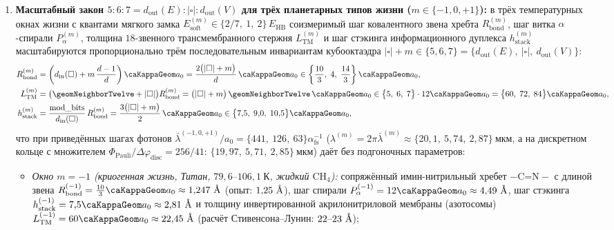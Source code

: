 \begin{theorem}
\begin{enumerate}[leftmargin=*]
\item \textbf{Масштабный закон $5:6:7 = d_{\mathrm{out}}(E) : |\square| : d_{\mathrm{out}}(V)$ для трёх планетарных типов жизни ($m\in\{-1,0,+1\}$):}
  в трёх температурных окнах жизни с квантами мягкого замка $E_{\mathrm{soft}}^{(m)} \in \{2/7,\ 1,\ 2\}\,E_{\mathrm{HB}}$ соизмеримый шаг ковалентного звена хребта $R_{\mathrm{bond}}^{(m)}$, шаг витка $\alpha$-спирали $P_\alpha^{(m)}$, толщина $18$-звенного трансмембранного стержня $L_{\mathrm{TM}}^{(m)}$ и шаг стэкинга информационного дуплекса $h_{\mathrm{stack}}^{(m)}$ масштабируются пропорционально трём последовательным инвариантам кубооктаэдра $|\square| + m \in \{5, 6, 7\} = \{d_{\mathrm{out}}(E),\ |\square|,\ d_{\mathrm{out}}(V)\}$:
  \begin{equation}
  \label{eq:bio-three-life-5-6-7-law}
  \begin{aligned}
    R_{\mathrm{bond}}^{(m)} &= \left(d_{\mathrm{in}}(\square) + m\,\frac{d-1}{d}\right)\caKappaGeom a_0
    = \frac{2\bigl(|\square| + m\bigr)}{d}\,\caKappaGeom a_0
    \in \left\{\frac{10}{3},\; 4,\; \frac{14}{3}\right\}\caKappaGeom a_0,\\
    L_{\mathrm{TM}}^{(m)} &= \bigl(\geomNeighborTwelve + |\square|\bigr) R_{\mathrm{bond}}^{(m)}
    = \bigl(|\square| + m\bigr)\,\geomNeighborTwelve\,\caKappaGeom a_0
    \in \bigl\{5,\; 6,\; 7\bigr\}\cdot 12\caKappaGeom a_0 = \bigl\{60,\; 72,\; 84\bigr\}\caKappaGeom a_0,\\
    h_{\mathrm{stack}}^{(m)} &= \frac{\mathrm{mod\_bits}}{d_{\mathrm{in}}(\square)}\,R_{\mathrm{bond}}^{(m)}
    = \frac{3\bigl(|\square| + m\bigr)}{2}\,\caKappaGeom a_0
    \in \bigl\{7{,}5,\; 9{,}0,\; 10{,}5\bigr\}\caKappaGeom a_0,
  \end{aligned}
  \end{equation}
  что при приведённых шагах фотонов $\bar\lambda^{(-1,0,+1)}/a_0 = \{441,\ 126,\ 63\}\alpha_{\mathrm{fs}}^{-1}$ ($\lambda^{(m)} = 2\pi\bar\lambda^{(m)} \approx \{20{,}1,\ 5{,}74,\ 2{,}87\}\ \text{мкм}$, а на дискретном кольце с множителем $\Phi_{\mathrm{Pauli}}/\Delta\varphi_{\mathrm{disc}} = 256/41$: $\{19{,}97,\ 5{,}71,\ 2{,}85\}\ \text{мкм}$) даёт без подгоночных параметров:
  \begin{itemize}[noitemsep]
  \item \emph{Окно $m=-1$ (криогенная жизнь, Титан, $79{,}6\text{--}106{,}1\ \text{К}$, жидкий $\text{CH}_4$):} сопряжённый имин-нитрильный хребет $-\text{C{=}N}-$ с длиной звена $R_{\mathrm{bond}}^{(-1)} = \frac{10}{3}\caKappaGeom a_0 \approx 1{,}247\ \text{\normalfont\AA}$ (опыт: $1{,}25\ \text{\normalfont\AA}$), шаг спирали $P_\alpha^{(-1)} = 12\caKappaGeom a_0 \approx 4{,}49\ \text{\normalfont\AA}$, шаг стэкинга $h_{\mathrm{stack}}^{(-1)} = 7{,}5\caKappaGeom a_0 \approx 2{,}81\ \text{\normalfont\AA}$ и толщину инвертированной акрилонитриловой мембраны (азотосомы) $L_{\mathrm{TM}}^{(-1)} = 60\caKappaGeom a_0 \approx 22{,}45\ \text{\normalfont\AA}$ (расчёт Стивенсона--Лунин: $22\text{--}23\ \text{\normalfont\AA}$);

\end{itemize}
\end{enumerate}
\end{theorem}
